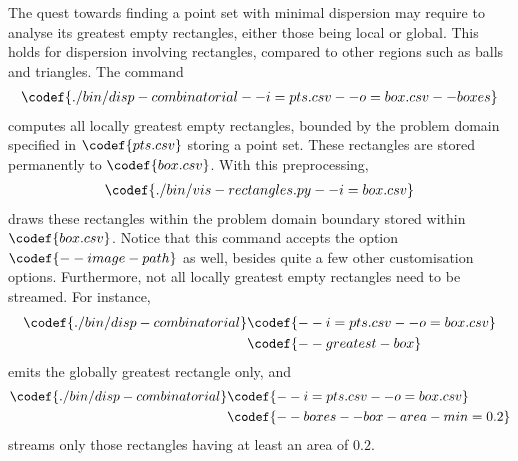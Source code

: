 The quest towards finding a point set with minimal dispersion may require to analyse its greatest empty rectangles, either those being local or global. This holds for dispersion involving rectangles, compared to other regions such as balls and triangles. The command
\begin{align*}
  \codef{./bin/disp-combinatorial --i=pts.csv --o=box.csv --boxes}
\end{align*}
computes all locally greatest empty rectangles, bounded by the problem domain specified in $\codef{pts.csv}$ storing a point set. These rectangles are stored permanently to $\codef{box.csv}$. With this preprocessing, 
\begin{align*}
  \codef{./bin/vis-rectangles.py --i=box.csv}
\end{align*}
draws these rectangles within the problem domain boundary stored within $\codef{box.csv}$. Notice that this command accepts the option $\codef{--image-path}$ as well, besides quite a few other customisation options. Furthermore, not all locally greatest empty rectangles need to be streamed. For instance,
\begin{align*}
  \codef{./bin/disp-combinatorial }&\codef{--i=pts.csv --o=box.csv}\\
  &\codef{--greatest-box}
\end{align*}
emits the globally greatest rectangle only, and
\begin{align*}
  \codef{./bin/disp-combinatorial }&\codef{--i=pts.csv --o=box.csv}\\
  &\codef{--boxes --box-area-min=0.2}
\end{align*}
streams only those rectangles having at least an area of $0.2$.

